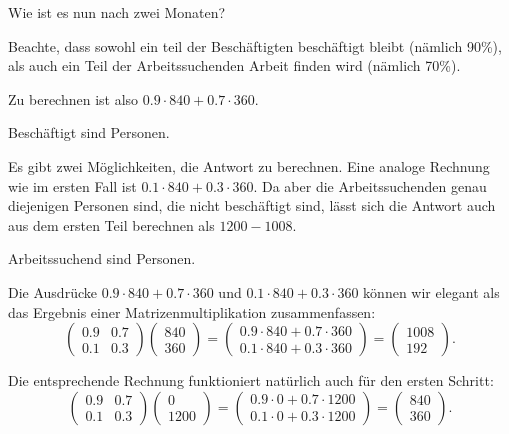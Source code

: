 \documentclass{ximera}
\begin{document}
\begin{question}
Wie ist es nun nach zwei Monaten?
\begin{solution}
\begin{hint}
Beachte, dass sowohl ein teil der Beschäftigten beschäftigt bleibt (nämlich 90\%), als auch ein Teil der Arbeitssuchenden Arbeit finden wird (nämlich 70\%).
\end{hint}
\begin{hint}
Zu berechnen ist also $0.9 \cdot 840 + 0.7 \cdot 360$.
\end{hint}
Beschäftigt sind  Personen.
\end{solution}
\begin{solution}
\begin{hint}
Es gibt zwei Möglichkeiten, die Antwort zu berechnen. Eine analoge Rechnung wie im ersten Fall ist $0.1 \cdot 840 + 0.3 \cdot 360$. Da aber die Arbeitssuchenden genau diejenigen Personen sind, die nicht beschäftigt sind, lässt sich die Antwort auch aus dem ersten Teil berechnen als $1200 - 1008$.
\end{hint}
Arbeitssuchend sind  Personen.
\end{solution}
\end{question}


Die Ausdrücke $0.9 \cdot 840 + 0.7 \cdot 360$ und $0.1 \cdot 840 + 0.3 \cdot 360$ können wir elegant als das Ergebnis einer Matrizenmultiplikation zusammenfassen:
\[
\left(
\begin{array}{cc}
0.9 & 0.7 \\
0.1 & 0.3    
\end{array}
\right) \left(
\begin{array}{c}
840 \\ 360    
\end{array}
\right) = \left(
\begin{array}{c}
0.9 \cdot 840 + 0.7 \cdot 360 \\
0.1 \cdot 840 + 0.3 \cdot 360
\end{array}
\right) = \left(
\begin{array}{c}
1008 \\ 192
\end{array}
\right).
\]

Die entsprechende Rechnung funktioniert natürlich auch für den ersten Schritt:
\[
\left(
\begin{array}{cc}
0.9 & 0.7 \\
0.1 & 0.3    
\end{array}
\right) \left(
\begin{array}{c}
0 \\ 1200    
\end{array}
\right) = \left(
\begin{array}{c}
0.9 \cdot 0 + 0.7 \cdot 1200 \\
0.1 \cdot 0 + 0.3 \cdot 1200
\end{array}
\right) = \left(
\begin{array}{c}
840 \\ 360
\end{array}
\right).
\]
\end{document}

